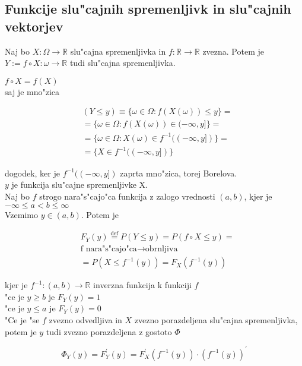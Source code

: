 \documentclass[a4paper,12pt]{article}
\theoremstyle{definition}
\theoremstyle{remark}
\newcommand{\R}{\mathbb{R}}
\begin{document}
\subsection{Funkcije slu"cajnih spremenljivk in slu"cajnih vektorjev}

Naj bo $X: \Omega \to \R$ slu"cajna spremenljivka in $f: \R \to \R$ zvezna. Potem je $Y := f \circ X: \omega \to \R$
tudi slu"cajna spremenljivka.




$f \circ X = f(X)$ \\
saj je mno"zica

\begin{align*}
    &(Y \leq y) \equiv \{\omega \in \Omega: f(X(\omega)) \leq y\} = \\
    &= \{\omega \in \Omega: f(X(\omega)) \in (-\infty, y]\} = \\
    &= \{\omega \in \Omega: X(\omega) \in f^{-1}((-\infty, y])\} = \\
    &= \{X \in f^{-1}((-\infty, y])\} 
\end{align*}

dogodek, ker je $f^{-1}((-\infty, y])$ zaprta mno"zica, torej Borelova. \\
$y$ je funkcija slu"cajne spremenljivke X. \\
Naj bo $f$ strogo nara"s"cajo"ca funkcija z zalogo vrednosti $(a,b)$, kjer je $-\infty \leq a < b \leq \infty$ \\
Vzemimo $y \in (a,b)$. Potem je

\begin{align*}
    &F_Y(y) \stackrel{\text{def}}{=} P(Y \leq y) = P(f \circ X \leq y) = \\
    &\text{f nara"s"cajo"ca} \to \text{obrnljiva} \\
    &= P(X \leq f^{-1}(y)) = F_X(f^{-1}(y))
\end{align*}

kjer je $f^{-1}: (a,b) \to \R$ inverzna funkcija k funkciji $f$ \\
"ce je $y \geq b$ je $F_Y(y) = 1$ \\
"ce je $y \leq a$ je $F_Y(y) = 0$ \\
"Ce je "se $f$ zvezno odvedljiva in $X$ zvezno porazdeljena slu"cajna spremenljivka, potem je $y$ tudi zvezno
porazdeljena z gostoto $\Phi$

\begin{equation*}
    \Phi_Y(y) = F_Y^{'}(y) = F_X^{'}(f^{-1}(y)) \cdot (f^{-1}(y))^{'}
\end{equation*}
\end{document}
